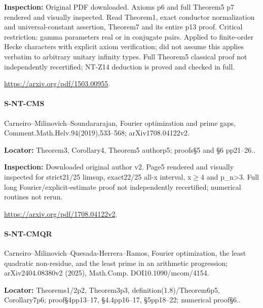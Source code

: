 \documentclass[11pt,a4paper]{article}
\begin{document}
\textbf{Inspection:} Original PDF downloaded.\allowbreak{} Axioms p6 and full Theorem5 p7 rendered and visually inspected.\allowbreak{} Read Theorem1, exact conductor normalization and universal-constant assertion, Theorem7 and its entire p13 proof.\allowbreak{} Critical restriction:\allowbreak{} gamma parameters real or in conjugate pairs.\allowbreak{} Applied to finite-order Hecke characters with explicit axiom verification; did not assume this applies verbatim to arbitrary unitary infinity types.\allowbreak{} Full Theorem5 classical proof not independently recertified; NT-Z14 deduction is proved and checked in full.\allowbreak{}

\url{https://arxiv.org/pdf/1503.00955}.

\paragraph{S-NT-CMS} Carneiro–\allowbreak{}Milinovich–\allowbreak{}Soundararajan, Fourier optimization and prime gaps, Comment.\allowbreak{}Math.\allowbreak{}Helv.\allowbreak{}94(2019),533–\allowbreak{}568; arXiv1708.\allowbreak{}04122v2.

\textbf{Locator:} Theorem3, Corollary4, Theorem5 authorp5; proofs§5 and §6 pp21–\allowbreak{}26.\allowbreak{}.

\textbf{Inspection:} Downloaded original author v2.\allowbreak{} Page5 rendered and visually inspected for strict21/\allowbreak{}25 limsup, exact22/\allowbreak{}25 all-x interval, x\ensuremath{\ge}4 and p\_\allowbreak{}n>3.\allowbreak{} Full long Fourier/\allowbreak{}explicit-estimate proof not independently recertified; numerical routines not rerun.\allowbreak{}

\url{https://arxiv.org/pdf/1708.04122v2}.

\paragraph{S-NT-CMQR} Carneiro–\allowbreak{}Milinovich–\allowbreak{}Quesada-Herrera–\allowbreak{}Ramos, Fourier optimization, the least quadratic non-residue, and the least prime in an arithmetic progression; arXiv2404.\allowbreak{}08380v2 (2025), Math.\allowbreak{}Comp.\allowbreak{} DOI10.\allowbreak{}1090/\allowbreak{}mcom/\allowbreak{}4154.

\textbf{Locator:} Theorems1/\allowbreak{}2p2, Theorem3p3, definition(1.\allowbreak{}8)/\allowbreak{}Theorem6p5, Corollary7p6; proof§4pp13–\allowbreak{}17, §4.\allowbreak{}4pp16–\allowbreak{}17, §5pp18–\allowbreak{}22; numerical proof§6.\allowbreak{}.
\end{document}
